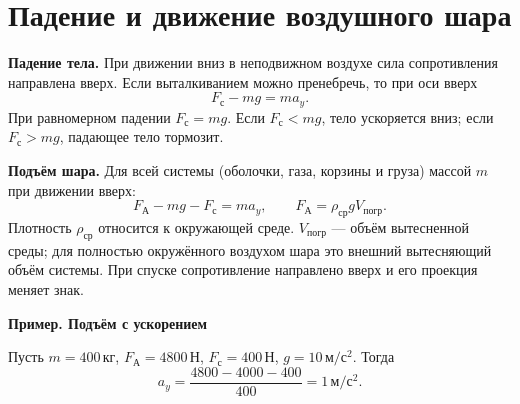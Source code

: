 \documentclass[a4paper,12pt]{article}
\newcommand{\fc}{F_{\text{с}}}
\newcommand{\fa}{F_{\text{А}}}
\newcommand{\unit}[1]{\,\text{#1}}
\newcommand{\acc}{\unit{м/с$^2$}}
\newcommand{\N}{\unit{Н}}
\newcommand{\kg}{\unit{кг}}
\newcommand{\example}[1]{\par\medskip\textbf{\textcolor{darkaccent}{#1}}\par}
\begin{document}
\section{Падение и движение воздушного шара}
\begin{center}
\end{center}
\textbf{Падение тела.} При движении вниз в неподвижном воздухе сила сопротивления направлена вверх. Если выталкиванием можно пренебречь, то при оси вверх
\[\fc-mg=ma_y.\]
При равномерном падении $\fc=mg$. Если $\fc<mg$, тело ускоряется вниз; если $\fc>mg$, падающее тело тормозит.

\textbf{Подъём шара.} Для всей системы (оболочки, газа, корзины и груза) массой $m$ при движении вверх:
\[\fa-mg-\fc=ma_y,\qquad \fa=\rho_{\text{ср}}gV_{\text{погр}}.\]
Плотность $\rho_{\text{ср}}$ относится к окружающей среде. $V_{\text{погр}}$ --- объём вытесненной среды; для полностью окружённого воздухом шара это внешний вытесняющий объём системы. При спуске сопротивление направлено вверх и его проекция меняет знак.
\example{Пример. Подъём с ускорением}
Пусть $m=400\kg$, $\fa=4800\N$, $\fc=400\N$, $g=10\acc$. Тогда
\[a_y=\frac{4800-4000-400}{400}=1\acc.\]
\clearpage
\end{document}
